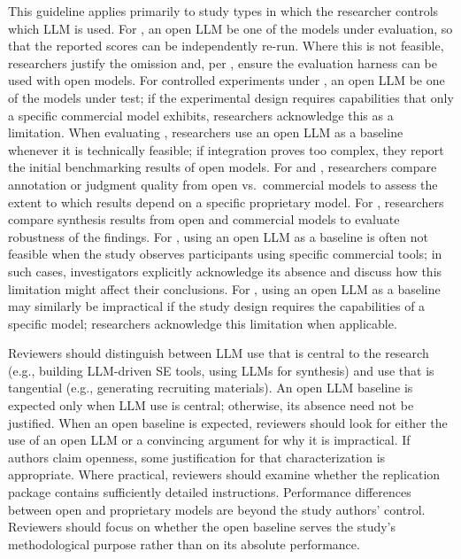 
This guideline applies primarily to study types in which the researcher controls which LLM is used.
For \benchmarkingtasks, an open LLM \should be one of the models under evaluation, so that the reported scores can be independently re-run. Where this is not feasible, researchers \should justify the omission and, per \design, ensure the evaluation harness can be used with open models.
For controlled experiments under \llmusage, an open LLM \should be one of the models under test; if the experimental design requires capabilities that only a specific commercial model exhibits, researchers \should acknowledge this as a limitation.
When evaluating \newtools, researchers \should use an open LLM as a baseline whenever it is technically feasible; if integration proves too complex, they \should report the initial benchmarking results of open models.
For \annotators and \judges, researchers \should compare annotation or judgment quality from open vs.\ commercial models to assess the extent to which results depend on a specific proprietary model.
For \synthesis, researchers \should compare synthesis results from open and commercial models to evaluate robustness of the findings.
For \llmusage, using an open LLM as a baseline is often not feasible when the study observes participants using specific commercial tools; in such cases, investigators \should explicitly acknowledge its absence and discuss how this limitation might affect their conclusions.
For \subjects, using an open LLM as a baseline may similarly be impractical if the study design requires the capabilities of a specific model; researchers \should acknowledge this limitation when applicable.


Reviewers should distinguish between LLM use that is central to the research (e.g., building LLM-driven SE tools, using LLMs for synthesis) and use that is tangential (e.g., generating recruiting materials). An open LLM baseline is expected only when LLM use is central; otherwise, its absence need not be justified.
When an open baseline is expected, reviewers should look for either the use of an open LLM or a convincing argument for why it is impractical. If authors claim openness, some justification for that characterization is appropriate. Where practical, reviewers should examine whether the replication package contains sufficiently detailed instructions.
Performance differences between open and proprietary models are beyond the study authors' control. Reviewers should focus on whether the open baseline serves the study's methodological purpose rather than on its absolute performance.

